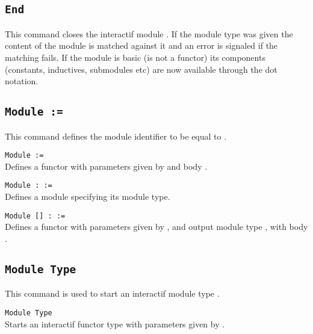 \subsection{\tt End {\ident}}
This command closes the interactif module {\ident}. If the module type
was given the content of the module is matched against it and an error
is signaled if the matching fails. If the module is basic (is not a
functor) its components (constants, inductives, submodules etc) are
now available through the dot notation.

\begin{ErrMsgs}
\item {}
\item {}
\item {}
\end{ErrMsgs}


\subsection{\tt Module {\ident} := {\modexpr}}
This command defines the module identifier {\ident} to be equal to \modexpr.

\begin{Variants}
\item{\tt Module \ident [\modbindings] := {\modexpr}}\\
  Defines a functor with parameters given by {\modbindings} and body \modexpr.
\item{\tt Module {\ident} \verb.:. {\modtype} := {\modexpr}}\\
  Defines a module specifying its module type.
\item{\tt Module {\ident} [\modbindings] \verb.:. {\modtype} := {\modexpr}}\\
  Defines a functor with parameters given by {\modbindings}, and
  output module type \modtype, with body {\modexpr}.
\end{Variants}

\subsection{\tt Module Type {\ident}}
This command is used to start an interactif module type {\ident}.

\begin{Variants}
\item{\tt Module Type \ident [\modbindings]}\\
  Starts an interactif functor type with parameters given by {\modbindings}.
\end{Variants}

